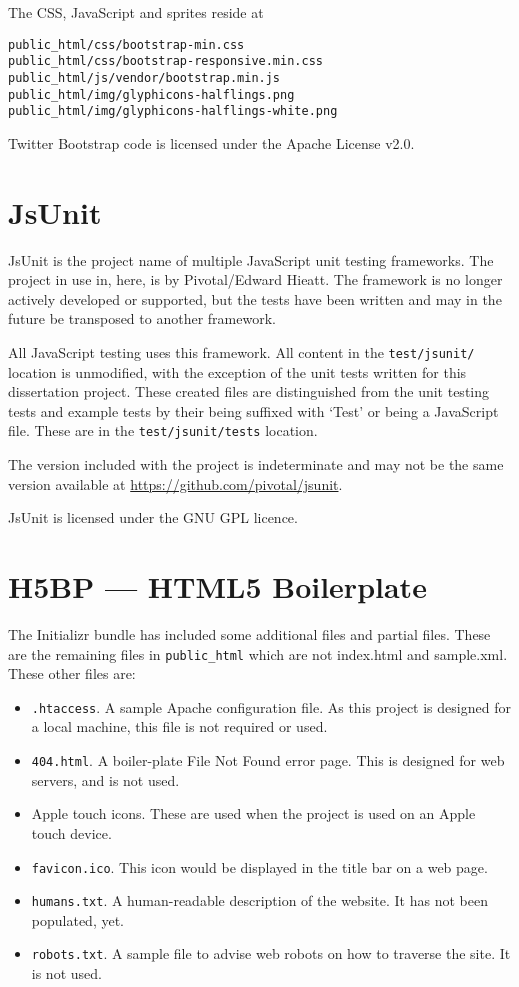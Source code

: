 The CSS, JavaScript and sprites reside at
\begin{verbatim}
public_html/css/bootstrap-min.css
public_html/css/bootstrap-responsive.min.css
public_html/js/vendor/bootstrap.min.js
public_html/img/glyphicons-halflings.png
public_html/img/glyphicons-halflings-white.png
\end{verbatim}

Twitter Bootstrap code is licensed under the Apache License v2.0.

\section{JsUnit}
JsUnit is the project name of multiple JavaScript unit testing frameworks. The project in use in, here, is by Pivotal\slash Edward Hieatt. The framework is no longer actively developed or supported, but the tests have been written and may in the future be transposed to another framework.

All Java\-Script testing uses this framework. All content in the \texttt{test/jsunit/} location is unmodified, with the exception of the unit tests written for this dissertation project. These created files are distinguished from the unit testing tests and example tests by their being suffixed with `Test' or being a Java\-Script file. These are in the \texttt{test/jsunit/tests} location.

The version included with the project is indeterminate and may not be the same version available at \url{https://github.com/pivotal/jsunit}.

JsUnit is licensed under the GNU GPL licence.

\section{H5BP --- HTML5 Boilerplate}
The Initializr bundle has included some additional files and partial files. These are the remaining files in \verb|public_html| which are not index.html and sample.xml. These other files are:
\begin{itemize}
	\item \texttt{.htaccess}. A sample Apache configuration file. As this project is designed for a local machine, this file is not required or used.
	\item \texttt{404.html}. A boiler-plate File Not Found error page. This is designed for web servers, and is not used.
	\item Apple touch icons. These are used when the project is used on an Apple touch device.
	\item \texttt{favicon.ico}. This icon would be displayed in the title bar on a web page.
	\item \texttt{humans.txt}. A human-readable description of the website. It has not been populated, yet.
	\item \texttt{robots.txt}. A sample file to advise web robots on how to traverse the site. It is not used.
\end{itemize}

